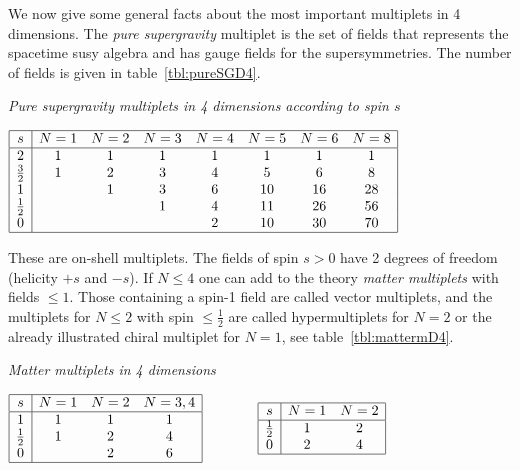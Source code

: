 \documentclass[a4paper,11pt,twoside]{article}
\newcommand{\ft}[2]{{\textstyle\frac{#1}{#2}}}
\begin{document}
We now give some general facts about the most important multiplets in 4
dimensions. The  \emph{pure supergravity} multiplet is the set of fields
that represents the spacetime susy algebra and has gauge fields for the
supersymmetries. The number of fields is given in
table~\ref{tbl:pureSGD4}.
\begin{table}[htbp]
  \caption{\it Pure supergravity multiplets in 4 dimensions according to spin $s$}
  \label{tbl:pureSGD4}
\begin{center}
  $\begin{array}{|c|ccccccc|}\hline
    s & N=1 & N=2 & N=3 & N=4 & N=5 & N=6 & N=8 \\ \hline
    2 & 1 & 1 & 1 & 1 & 1 & 1 & 1 \\
    \ft32 & 1 & 2 & 3 & 4 & 5 & 6 & 8 \\
    1 &   & 1 & 3 & 6 & 10 & 16 & 28 \\
    \ft12 &   &   & 1 & 4 & 11 & 26 & 56 \\
    0 &   &   &   & 2 & 10 & 30 & 70 \\ \hline
  \end{array}$
\end{center}
\end{table}
These are on-shell multiplets. The fields of spin $s>0$ have 2 degrees of
freedom (helicity $+s$ and $-s$). If $N\leq 4$ one can add to the theory
\emph{matter multiplets} with fields $\leq 1$. Those containing a spin-1
field are called vector multiplets, and the multiplets for $N\leq 2$ with
spin $\leq \ft12$ are called hypermultiplets for $N=2$ or the already
illustrated chiral multiplet for $N=1$, see table~\ref{tbl:mattermD4}.
\begin{table}[htbp]
  \caption{\it Matter multiplets in 4 dimensions}\label{tbl:mattermD4}
\begin{center}
  $\begin{array}{|c|ccc|}\hline
    s & N=1 & N=2 & N=3,4 \\ \hline
    1  & 1 & 1 & 1 \\
    \ft12 & 1 & 2 & 4 \\
    0 &   & 2 & 6 \\ \hline
  \end{array}     \qquad\qquad
\begin{array}{|c|cc|}\hline
    s & N=1 & N=2 \\ \hline
    \ft12 & 1 & 2 \\
    0 & 2 & 4 \\ \hline
  \end{array}$
\end{center}
\end{table}
\end{document}
